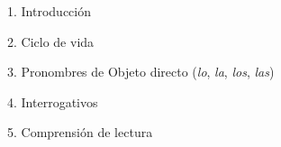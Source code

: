 \begin{slideToC}
\item 1. Introducción
\item 2. Ciclo de vida 
\item 3. Pronombres de Objeto directo (\textit{lo}, \textit{la}, \textit{los}, \textit{las}) 
\item 4. Interrogativos 
\item 5. Comprensión de lectura 
\end{slideToC}